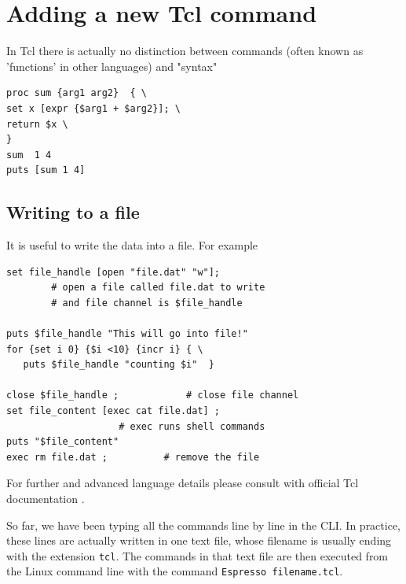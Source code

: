 \documentclass[
paper=a4,                       %
fontsize=11pt,                  %
twoside,                        %
footsepline,                    %
headsepline,                    %
headinclude=false,              %
footinclude=false,              %
pagesize,                       %
]{scrartcl}
\begin{document}
\section{Adding a new Tcl command}
     
In Tcl there is actually no distinction between commands (often known as 
'functions' in other languages) and "syntax" \cite{tcl_tut_url}

{\small\vspace{0,2cm}
\begin{lstlisting}[numbers=none]
proc sum {arg1 arg2}  { \
set x [expr {$arg1 + $arg2}]; \
return $x \
} 
sum  1 4
puts [sum 1 4]

\end{lstlisting}\vspace{0,2cm}
}


\subsection{Writing to a file}
It is useful to write the data into a file. For example

{\small\vspace{0,2cm}
\begin{lstlisting}[numbers=none]
set file_handle [open "file.dat" "w"];
		# open a file called file.dat to write 
		# and file channel is $file_handle
		
puts $file_handle "This will go into file!"
for {set i 0} {$i <10} {incr i} { \
   puts $file_handle "counting $i"  }

close $file_handle ;			# close file channel
set file_content [exec cat file.dat] ;
					# exec runs shell commands
puts "$file_content"
exec rm file.dat ;			# remove the file
\end{lstlisting} }\vspace{0,2cm}


\noindent For further and advanced language details please consult with official Tcl
documentation \cite{tcl_url}.

\noindent So far, we have been typing all the commands line by line in the CLI. In
practice, these lines are actually written in one text file, whose filename is 
usually ending with the extension \texttt{tcl}. The commands in that text file
are then executed from the Linux command line with the command \texttt{Espresso
filename.tcl}. 
\end{document}
